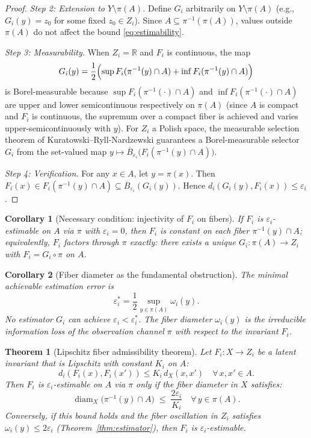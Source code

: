 \documentclass[11pt]{article}
\newtheorem{theorem}{Theorem}
\newtheorem{corollary}{Corollary}
\begin{document}
\begin{proof}
\emph{Step 2: Extension to $Y\setminus\pi(A)$.} Define $G_i$ arbitrarily on $Y\setminus\pi(A)$ (e.g., $G_i(y)=z_0$ for some fixed $z_0\in Z_i$). Since $A\subseteq\pi^{-1}(\pi(A))$, values outside $\pi(A)$ do not affect the bound \eqref{eq:estimability}.

\emph{Step 3: Measurability.} When $Z_i=\mathbb{R}$ and $F_i$ is continuous, the map
\[
G_i(y)=\frac{1}{2}\Bigl(\sup F_i(\pi^{-1}(y)\cap A)+\inf F_i(\pi^{-1}(y)\cap A)\Bigr)
\]
is Borel-measurable because $\sup F_i(\pi^{-1}(\cdot)\cap A)$ and $\inf F_i(\pi^{-1}(\cdot)\cap A)$ are upper and lower semicontinuous respectively on $\pi(A)$ (since $A$ is compact and $F_i$ is continuous, the supremum over a compact fiber is achieved and varies upper-semicontinuously with $y$). For $Z_i$ a Polish space, the measurable selection theorem of Kuratowski--Ryll-Nardzewski guarantees a Borel-measurable selector $G_i$ from the set-valued map $y\mapsto\overline{B}_{\varepsilon_i}\bigl(F_i(\pi^{-1}(y)\cap A)\bigr)$.

\emph{Step 4: Verification.} For any $x\in A$, let $y=\pi(x)$. Then $F_i(x)\in F_i(\pi^{-1}(y)\cap A)\subseteq\overline{B}_{\varepsilon_i}(G_i(y))$. Hence $d_i(G_i(y),F_i(x))\leq\varepsilon_i$.\qedhere
\end{proof}

\begin{corollary}[Necessary condition: injectivity of $F_i$ on fibers]
If $F_i$ is $\varepsilon_i$-estimable on $A$ via $\pi$ with $\varepsilon_i=0$, then $F_i$ is constant on each fiber $\pi^{-1}(y)\cap A$; equivalently, $F_i$ factors through $\pi$ exactly: there exists a unique $G_i\colon\pi(A)\to Z_i$ with $F_i=G_i\circ\pi$ on $A$.
\end{corollary}

\begin{corollary}[Fiber diameter as the fundamental obstruction]
The minimal achievable estimation error is
\[
\varepsilon_i^{*}=\frac{1}{2}\sup_{y\in\pi(A)}\omega_i(y).
\]
No estimator $G_i$ can achieve $\varepsilon_i<\varepsilon_i^{*}$. The fiber diameter $\omega_i(y)$ is the irreducible information loss of the observation channel $\pi$ with respect to the invariant $F_i$.
\end{corollary}

\begin{theorem}[Lipschitz fiber admissibility theorem]\label{thm:lipschitz-fiber}
Let $F_i\colon X\to Z_i$ be a latent invariant that is Lipschitz with constant $K_i$ on $A$:
\begin{equation}\label{eq:lipschitz-invariant}
d_i(F_i(x),F_i(x'))\leq K_i\,d_X(x,x')\quad\forall\,x,x'\in A.
\end{equation}
Then $F_i$ is $\varepsilon_i$-estimable on $A$ via $\pi$ only if the fiber diameter in $X$ satisfies:
\begin{equation}\label{eq:fiber-diam-X}
\operatorname{diam}_X\!\bigl(\pi^{-1}(y)\cap A\bigr)\;\leq\;\frac{2\varepsilon_i}{K_i}\quad\forall\,y\in\pi(A).
\end{equation}
Conversely, if this bound holds and the fiber oscillation in $Z_i$ satisfies $\omega_i(y)\leq 2\varepsilon_i$ (Theorem~\ref{thm:estimator}), then $F_i$ is $\varepsilon_i$-estimable.
\end{theorem}
\end{document}
